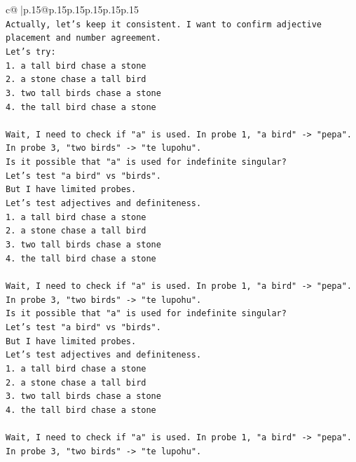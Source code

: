 \documentclass{article}
\begin{document}
{\begin{supertabular}{c@{$\;$}|p{.15\linewidth}@{}p{.15\linewidth}p{.15\linewidth}p{.15\linewidth}p{.15\linewidth}p{.15\linewidth}}
{{{\\ 
\texttt{Actually, let's keep it consistent. I want to confirm adjective placement and number agreement.} \\
\texttt{Let's try:} \\
\texttt{1. a tall bird chase a stone} \\
\texttt{2. a stone chase a tall bird} \\
\texttt{3. two tall birds chase a stone} \\
\texttt{4. the tall bird chase a stone} \\
\\ 
\texttt{Wait, I need to check if "a" is used. In probe 1, "a bird" {-}> "pepa". In probe 3, "two birds" {-}> "te lupohu".} \\
\texttt{Is it possible that "a" is used for indefinite singular?} \\
\texttt{Let's test "a bird" vs "birds".} \\
\texttt{But I have limited probes.} \\
\texttt{Let's test adjectives and definiteness.} \\
\texttt{1. a tall bird chase a stone} \\
\texttt{2. a stone chase a tall bird} \\
\texttt{3. two tall birds chase a stone} \\
\texttt{4. the tall bird chase a stone} \\
\\ 
\texttt{Wait, I need to check if "a" is used. In probe 1, "a bird" {-}> "pepa". In probe 3, "two birds" {-}> "te lupohu".} \\
\texttt{Is it possible that "a" is used for indefinite singular?} \\
\texttt{Let's test "a bird" vs "birds".} \\
\texttt{But I have limited probes.} \\
\texttt{Let's test adjectives and definiteness.} \\
\texttt{1. a tall bird chase a stone} \\
\texttt{2. a stone chase a tall bird} \\
\texttt{3. two tall birds chase a stone} \\
\texttt{4. the tall bird chase a stone} \\
\\ 
\texttt{Wait, I need to check if "a" is used. In probe 1, "a bird" {-}> "pepa". In probe 3, "two birds" {-}> "te lupohu".} \\
}}}
\end{supertabular}}
\end{document}
